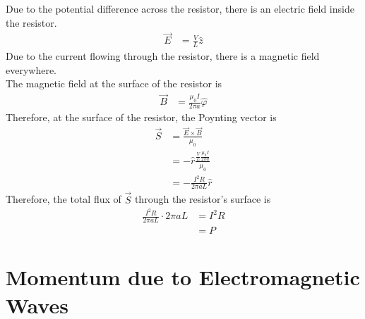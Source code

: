 \documentclass[fleqn, a4paper, 12pt, twoside]{article}
\theoremstyle{definition}
\theoremstyle{theorem}
\begin{document}
\begin{solution}
	Due to the potential difference across the resistor, there is an electric field inside the resistor.
	\begin{align*}
		\overrightarrow{E} &= \frac{V}{L} \hat{z}
	\end{align*}
	Due to the current flowing through the resistor, there is a magnetic field everywhere.\\
	The magnetic field at the surface of the resistor is
	\begin{align*}
		\overrightarrow{B} &= \frac{\mu_0 I}{2 \pi a} \hat{\varphi}
	\end{align*}
	Therefore, at the surface of the resistor, the Poynting vector is
	\begin{align*}
		\overrightarrow{S} &= \frac{\overrightarrow{E} \times \overrightarrow{B}}{\mu_0}\\
		&= -\hat{r} \frac{\frac{V}{L} \frac{\mu_0 I}{2 \pi a}}{\mu_0}\\
		&= -\frac{I^2 R}{2 \pi a L} \hat{r}
	\end{align*}
	Therefore, the total flux of $\overrightarrow{S}$ through the resistor's surface is
	\begin{align*}
		\frac{I^2 R}{2 \pi a L} \cdot 2 \pi a L &= I^2 R\\
		&= P
	\end{align*}
\end{solution}

\section{Momentum due to Electromagnetic Waves}
\end{document}
